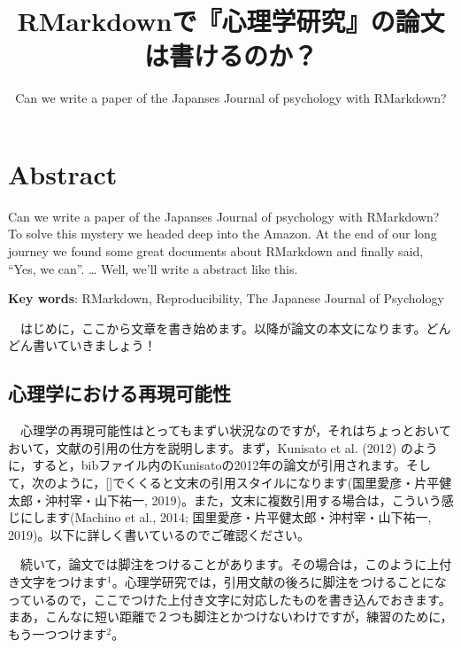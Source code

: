 \documentclass[11pt,a4paper,xelatex,ja=standard]{bxjsarticle}
\title{RMarkdownで『心理学研究』の論文は書けるのか？}
\subtitle{Can we write a paper of the Japanses Journal of psychology with
RMarkdown?}
\author{}
\date{}
\begin{document}
\pagestyle{empty}
\maketitle
\pagestyle{plain}
\setcounter{page}{1}

\hypertarget{abstract}{%
\section{Abstract}\label{abstract}}

Can we write a paper of the Japanses Journal of psychology with
RMarkdown? To solve this mystery we headed deep into the Amazon. At the
end of our long journey we found some great documents about RMarkdown
and finally said, ``Yes, we can''. \ldots{} Well, we'll write a abstract
like this.

\textbf{Key words}: RMarkdown, Reproducibility, The Japanese Journal of
Psychology

\clearpage

　はじめに，ここから文章を書き始めます。以降が論文の本文になります。どんどん書いていきましょう！

\hypertarget{ux5fc3ux7406ux5b66ux306bux304aux3051ux308bux518dux73feux53efux80fdux6027}{%
\subsection{心理学における再現可能性}\label{ux5fc3ux7406ux5b66ux306bux304aux3051ux308bux518dux73feux53efux80fdux6027}}

　心理学の再現可能性はとってもまずい状況なのですが，それはちょっとおいておいて，文献の引用の仕方を説明します。まず，Kunisato
et al. (2012)
のように，すると，bibファイル内のKunisatoの2012年の論文が引用されます。そして，次のように，{[}{]}でくくると文末の引用スタイルになります(国里愛彦・片平健太郎・沖村宰・山下祐一,
2019)。また，文末に複数引用する場合は，こういう感じにします(Machino et
al., 2014; 国里愛彦・片平健太郎・沖村宰・山下祐一,
2019)。以下に詳しく書いているのでご確認ください。 　

　続いて，論文では脚注をつけることがあります。その場合は，このように上付き文字をつけます\({}^1\)。心理学研究では，引用文献の後ろに脚注をつけることになっているので，ここでつけた上付き文字に対応したものを書き込んでおきます。まあ，こんなに短い距離で２つも脚注とかつけないわけですが，練習のために，もう一つつけます\({}^2\)。

\clearpage
\end{document}
